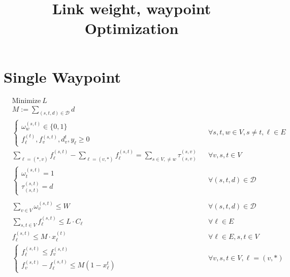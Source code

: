 \documentclass[a4paper,USenglish]{lipics-v2018}
\title{Link weight, waypoint Optimization}
\begin{document}
\maketitle

\section{Single Waypoint}

\begin{align}
& \text{Minimize} ~L \nonumber	&&\\
&M := \sum_{ (s,t,d) \in \mathcal{D}} d &&
\\
&\begin{cases}
\omega^{(s,t)}_{w} \in \{0,1\} \\
f^{(t)}_{\ell}, f^{(s,t)}_{v}, d^{t}_v, y_{\ell}  \geq 0
\end{cases}
&&\forall  s,t,w \in V, s \neq t, \ell \in E \label{LP:vardef}    
\\
&\sum_{\ell = (*,v)} f^{(s,t)}_{\ell} - 
	\sum_{\ell= (v,*)}f^{(s,t)}_{\ell}
	= \sum_{ s\in V,\neq w} \tau^{(s,v)}_{(s,v)}
&& \forall v,s,t \in V
\label{LP:sw}
\\
& 
\begin{cases}
\omega^{(s,t)}_{t} = 1 \\
\tau^{(s,t)}_{(s,t)} = d
\end{cases}
&& \forall (s,t,d) \in \mathcal{D}
\label{LP:wp_t}
\\
&
\\
&\sum_{v \in V}  \omega^{(s,t)}_v \leq W
&& \forall (s,t,d) \in \mathcal{D}
\label{LP:wp_limit} 
\\
& \sum_{ s,t \in V} f^{(s,t)}_{\ell} \leq L \cdot C_{\ell}
&& \forall \ell \in E
\\
&   f^{(s,t)}_{\ell} \leq M \cdot x^{(t)}_{\ell}
&& \forall \ell \in E, s,t \in V
\label{LP:SPTree} 
\\
&
\begin{cases*}
f^{(s,t)}_{\ell} \leq f^{(s,t)}_{v}	\\
f^{(s,t)}_{v} - f^{(s,t)}_{\ell} \leq M(1 - x^{t}_{\ell}) 
\end{cases*}	
&& \forall v,s,t \in V, \ell = (v,*)
\label{LP:equalSplit} 
\\ 

\end{align}
\end{document}
